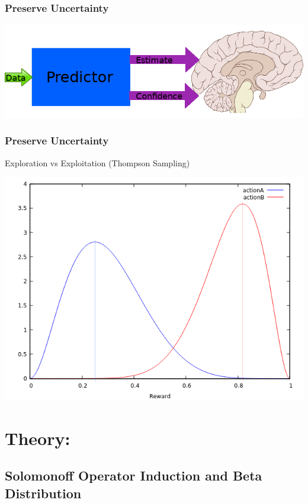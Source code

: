 \documentclass{beamer}
\begin{document}
\begin{frame}[fragile]
  \frametitle{Preserve Uncertainty}

  \includegraphics[scale=0.5]{images/preserve_uncertainty.png}
\end{frame}

\begin{frame}[fragile]
  \frametitle{Preserve Uncertainty}

  Exploration vs Exploitation (Thompson Sampling)

  \begin{center}
    \includegraphics[scale=0.55]{images/ActionA_ActionB_lines.png}
  \end{center}
\end{frame}

\section{Theory:}
\subsection{Solomonoff Operator Induction and Beta Distribution}
\end{document}
